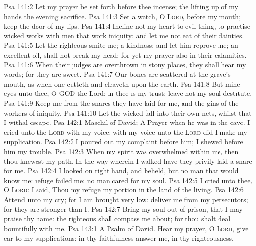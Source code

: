 \vs Psa 141:2 Let my prayer be set forth before thee  incense;  the lifting up of my hands  the evening sacrifice.
\vs Psa 141:3 Set a watch, O \textsc{Lord}, before my mouth; keep the door of my lips.
\vs Psa 141:4 Incline not my heart to  evil thing, to practise wicked works with men that work iniquity: and let me not eat of their dainties.
\vs Psa 141:5 Let the righteous smite me;  a kindness: and let him reprove me;  an excellent oil,  shall not break my head: for yet my prayer also  in their calamities.
\vs Psa 141:6 When their judges are overthrown in stony places, they shall hear my words; for they are sweet.
\vs Psa 141:7 Our bones are scattered at the grave's mouth, as when one cutteth and cleaveth  upon the earth.
\vs Psa 141:8 But mine eyes  unto thee, O GOD the Lord: in thee is my trust; leave not my soul destitute.
\vs Psa 141:9 Keep me from the snares  they have laid for me, and the gins of the workers of iniquity.
\vs Psa 141:10 Let the wicked fall into their own nets, whilst that I withal escape.
\vs Psa 142:1 Maschil of David; A Prayer when he was in the cave. I cried unto the \textsc{Lord} with my voice; with my voice unto the \textsc{Lord} did I make my supplication.
\vs Psa 142:2 I poured out my complaint before him; I shewed before him my trouble.
\vs Psa 142:3 When my spirit was overwhelmed within me, then thou knewest my path. In the way wherein I walked have they privily laid a snare for me.
\vs Psa 142:4 I looked on  right hand, and beheld, but  no man that would know me: refuge failed me; no man cared for my soul.
\vs Psa 142:5 I cried unto thee, O \textsc{Lord}: I said, Thou  my refuge  my portion in the land of the living.
\vs Psa 142:6 Attend unto my cry; for I am brought very low: deliver me from my persecutors; for they are stronger than I.
\vs Psa 142:7 Bring my soul out of prison, that I may praise thy name: the righteous shall compass me about; for thou shalt deal bountifully with me.
\vs Psa 143:1 A Psalm of David. Hear my prayer, O \textsc{Lord}, give ear to my supplications: in thy faithfulness answer me,  in thy righteousness.
